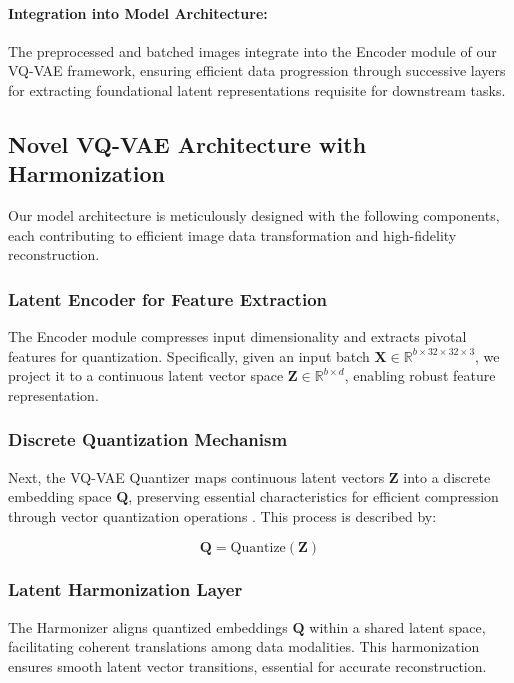 \paragraph{Integration into Model Architecture:} 

The preprocessed and batched images integrate into the Encoder module of our VQ-VAE framework, ensuring efficient data progression through successive layers for extracting foundational latent representations requisite for downstream tasks.

\subsection{Novel VQ-VAE Architecture with Harmonization}

Our model architecture is meticulously designed with the following components, each contributing to efficient image data transformation and high-fidelity reconstruction.

\subsubsection{Latent Encoder for Feature Extraction}

The Encoder module compresses input dimensionality and extracts pivotal features for quantization. Specifically, given an input batch $\mathbf{X} \in \mathbb{R}^{b \times 32 \times 32 \times 3}$, we project it to a continuous latent vector space $\mathbf{Z} \in \mathbb{R}^{b \times d}$, enabling robust feature representation.

\subsubsection{Discrete Quantization Mechanism}

Next, the VQ-VAE Quantizer maps continuous latent vectors $\mathbf{Z}$ into a discrete embedding space $\mathbf{Q}$, preserving essential characteristics for efficient compression through vector quantization operations \cite{oord2017neural}. This process is described by:

\[
\mathbf{Q} = \text{Quantize}(\mathbf{Z})
\]

\subsubsection{Latent Harmonization Layer}

The Harmonizer aligns quantized embeddings $\mathbf{Q}$ within a shared latent space, facilitating coherent translations among data modalities. This harmonization ensures smooth latent vector transitions, essential for accurate reconstruction.

